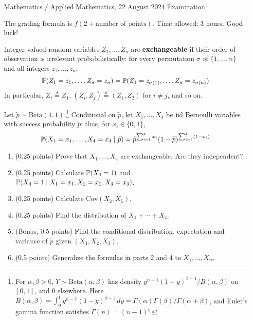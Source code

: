 \documentclass[a4paper]{report}
\begin{document}
\noindent Mathematics / Applied Mathematics, 22 August 2024 \hfill Examination
\hrulefill
\begin{it}The grading formula is $f(2+\text{number of points})$. Time allowed: 3 hours. Good luck!\end{it}
Integer-valued random variables $Z_1,\ldots,Z_n$ are \textbf{exchangeable} if their order of observation is irrelevant probabilistically: for every permutation $\sigma$ of $\{1,\ldots,n\}$ and all integers $z_1,\ldots,z_n$,
\[\P(Z_1=z_1,\ldots,Z_n=z_n)=\P(Z_1=z_{\sigma(1)},\ldots,Z_n=z_{\sigma(n)}).\]
In particular, $Z_i\overset d=Z_1$, $(Z_i,Z_j)\overset d=(Z_1,Z_2)$ for $i\neq j$, and so on.
\begin{problem}
Let $\widetilde p\sim\mathrm{Beta}(1,1)$.\footnote{For $\alpha,\beta>0$, $Y\sim\mathrm{Beta}(\alpha,\beta)$ has density $y^{\alpha-1}(1-y)^{\beta-1}/B(\alpha,\beta)$ on $[0,1]$, and 0 elsewhere. Here $B(\alpha,\beta)=\int_0^1y^{\alpha-1}(1-y)^{\beta-1}\,dy=\Gamma(\alpha)\Gamma(\beta)/\Gamma(\alpha+\beta)$, and Euler's gamma function satisfies $\Gamma(n)=(n-1)!$.} Conditional on $\widetilde p$, let $X_1,\ldots,X_4$ be iid Bernoulli variables with success probability $\widetilde p$; thus, for $x_i\in\{0,1\}$,
\[\P(X_1=x_1,\ldots,X_4=x_4\mid\widetilde p)=\widetilde p^{\sum_{i=1}^4x_i}(1-\widetilde p)^{\sum_{i=1}^4(1-x_i)}.\]
\begin{enumerate}
\item (0.25 points) Prove that $X_1,\ldots,X_4$ are exchangeable. Are they independent?
\item (0.25 points) Calculate $\P(X_4=1)$ and $\P(X_4=1\mid X_1=x_1,X_2=x_2,X_3=x_3)$.
\item (0.25 points) Calculate $\mathrm{Cov}(X_2,X_5)$.
\item (0.25 points) Find the distribution of $X_1+\cdots+X_4$.
\item (Bonus, 0.5 points) Find the conditional distribution, expectation and variance of $\widetilde p$ given $(X_1,X_2,X_3)$.
\item (0.5 points) Generalize the formulas in parts 2 and 4 to $X_1,\ldots,X_n$.
\end{enumerate}
\end{problem}
\end{document}
